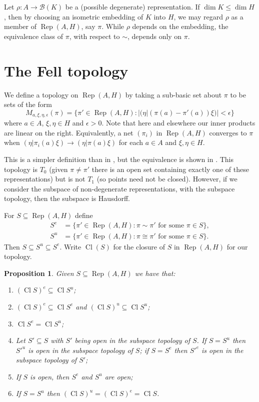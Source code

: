 \documentclass[a4paper,11pt]{article}
\newcommand{\mc}[1]{{\mathcal{#1}}}
\newcommand{\Rep}{\operatorname{Rep}}
\newcommand{\Cl}{\operatorname{Cl}}
\newtheorem{proposition}[lemma]{Proposition}
\begin{document}
Let $\rho:A\rightarrow\mc B(K)$ be a (possible degenerate) representation.
If $\dim K \leq \dim H$, then by choosing an isometric embedding of $K$ into
$H$, we may regard $\rho$ as a member of $\Rep(A,H)$, say $\pi$.  While $\rho$ depends on the embedding, the equivalence class of $\pi$, with respect to
$\sim$, depends only on $\pi$.

\section{The Fell topology}

We define a topology on $\Rep(A,H)$ by taking a sub-basic set about $\pi$
to be sets of the form
\[ M_{a,\xi,\eta,\epsilon}(\pi) =
\big\{ \pi'\in\Rep(A,H) : |(\eta|(\pi(a)-\pi'(a))\xi)|<\epsilon \big\} \]
where $a\in A$, $\xi,\eta\in H$ and $\epsilon>0$.  Note that here and elsewhere
our inner products are linear on the right.
Equivalently, a net $(\pi_i)$ in $\Rep(A,H)$ converges to $\pi$ when
$(\eta|\pi_i(a)\xi) \rightarrow (\eta|\pi(a)\xi)$ for each $a\in A$ and 
$\xi,\eta\in H$.

This is a simpler definition than in \cite{fell1}, but the equivalence
is shown in \cite[?TODO?]{fell2}.  This topology is $T_0$ (given
$\pi\not=\pi'$ there is an open set containing exactly one of these
representations) but is not $T_1$ (so points need not be closed).  However,
if we consider the subspace of non-degenerate representations, with the
subspace topology, then the subspace is Hausdorff.

For $S \subseteq \Rep(A,H)$ define
\begin{align*}
S^e &= \{ \pi'\in\Rep(A,H) : \pi\sim\pi' \text{ for some } \pi\in S \}, \\
S^u &= \{ \pi'\in\Rep(A,H) : \pi\cong\pi' \text{ for some } \pi\in S \}.
\end{align*}
Then $S \subseteq S^u \subseteq S^e$.  Write $\Cl(S)$ for the closure of
$S$ in $\Rep(A,H)$ for our topology.

\begin{proposition}
Given $S\subseteq\Rep(A,H)$ we have that:
\begin{enumerate}
\item $(\Cl S)^e \subseteq \Cl S^u$;
\item $(\Cl S)^e \subseteq \Cl S^e$ and $(\Cl S)^u \subseteq \Cl S^u$;
\item $\Cl S^e = \Cl S^u$;
\item Let $S' \subseteq S$ with $S'$ being open in the subspace topology
of $S$.  If $S=S^u$ then ${S'}^u$ is open in the subspace topology of $S$;
if $S=S^e$ then ${S'}^e$ is open in the subspace topology of $S'$;
\item If $S$ is open, then $S^e$ and $S^u$ are open;
\item If $S = S^u$ then $(\Cl S)^u = (\Cl S)^e = \Cl S$.
\end{enumerate}
\end{proposition}
\end{document}
